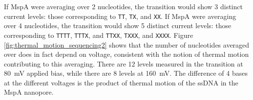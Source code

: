 If MspA were averaging over 2 nucleotides, the transition would show 3 distinct current levels: those corresponding to \texttt{TT}, \texttt{TX}, and \texttt{XX}.  If MspA were averaging over 4 nucleotides, the transition would show 5 distinct current levels: those corresponding to \texttt{TTTT}, \texttt{TTTX}, and \texttt{TTXX}, \texttt{TXXX}, and \texttt{XXXX}.  Figure \ref{fig:thermal_motion_sequencing2} shows that the number of nucleotides averaged over does in fact depend on voltage, consistent with the notion of thermal motion contributing to this averaging.  There are 12 levels measured in the transition at \SI{80}{\mV} applied bias, while there are 8 levels at \SI{160}{\mV}.  The difference of 4 bases at the different voltages is the product of thermal motion of the ssDNA in the MspA nanopore.

